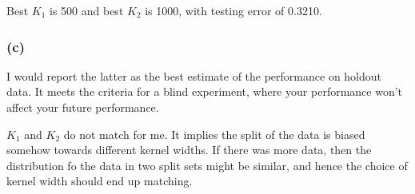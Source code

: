 \documentclass[letterpaper,10pt]{article} %
\begin{document}
Best $K_1$ is 500 and best $K_2$ is 1000, with testing error of 0.3210.

\subsubsection*{(c)}

I would report the latter as the best estimate of the performance on holdout data. It meets the criteria for a blind experiment, where your performance won't affect your future performance. 

$K_1$ and $K_2$ do not match for me. It implies the split of the data is biased somehow towards different kernel widths. If there was more data, then the distribution fo the data in two split sets might be similar, and hence the choice of kernel width should end up matching.

%
%

\end{document}
